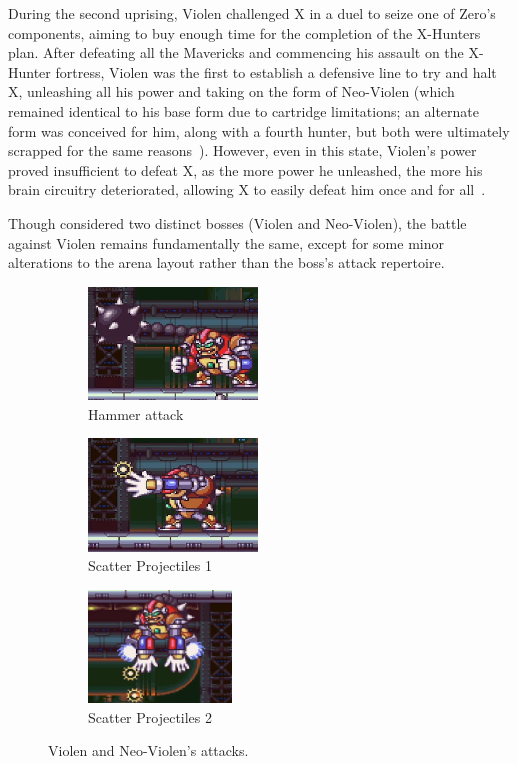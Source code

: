 During the second uprising, Violen challenged X in a duel to seize one of Zero's components, aiming to buy enough time for the completion of the X-Hunters plan. After defeating all the Mavericks and commencing his assault on the X-Hunter fortress, Violen was the first to establish a defensive line to try and halt X, unleashing all his power and taking on the form of Neo-Violen (which remained identical to his base form due to cartridge limitations; an alternate form was conceived for him, along with a fourth hunter, but both were ultimately scrapped for the same reasons~\cite{book:MMX_Complete_art}). However, even in this state, Violen's power proved insufficient to defeat X, as the more power he unleashed, the more his brain circuitry deteriorated, allowing X to easily defeat him once and for all~\cite{wayback:X2_resources}.

Though considered two distinct bosses (Violen and Neo-Violen), the battle against Violen remains fundamentally the same, except for some minor alterations to the arena layout rather than the boss's attack repertoire.
\begin{figure}[htp]
	\centering
	\begin{subfigure}{0.4\linewidth}
		\centering
		\includegraphics[height=3cm]{figures/X2/Hunter_stages/Violen_swing.png}
		\caption{Hammer attack}
	\end{subfigure}
	\begin{subfigure}{0.4\linewidth}
		\centering
		\includegraphics[height=3cm]{figures/X2/Hunter_stages/Violen_bullet.png}
		\caption{Scatter Projectiles 1}
	\end{subfigure}
	\begin{subfigure}{0.4\linewidth}
		\centering
		\includegraphics[height=3cm]{figures/X2/Hunter_stages/Violen_air_bullet.png}
		\caption{Scatter Projectiles 2}
	\end{subfigure}
	\caption{Violen and Neo-Violen's attacks.}	
\end{figure}

